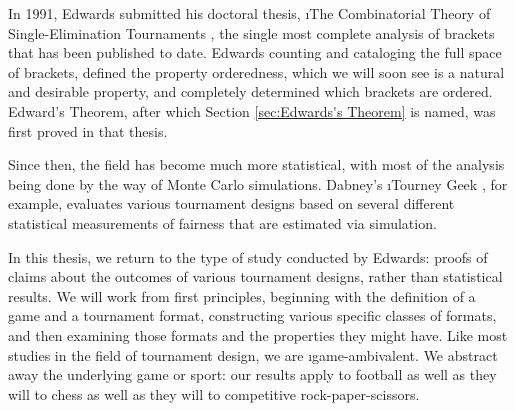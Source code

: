 {       %


    In 1991, Edwards submitted his doctoral thesis, \i{The Combinatorial Theory of Single-Elimination Tournaments} \cite{montana}, the single most complete analysis of brackets that has been published to date. Edwards counting and cataloging the full space of brackets, defined the property orderedness, which we will soon see is a natural and desirable property, and completely determined which brackets are ordered. Edward's Theorem, after which Section \ref{sec:Edwards's Theorem} is named, was first proved in that thesis.

    Since then, the field has become much more statistical, with most of the analysis being done by the way of Monte Carlo simulations. Dabney's \i{Tourney Geek} \cite{geek}, for example, evaluates various tournament designs based on several different statistical measurements of fairness that are estimated via simulation.
    
    In this thesis, we return to the type of study conducted by Edwards: proofs of claims about the outcomes of various tournament designs, rather than statistical results. We will work from first principles, beginning with the definition of a game and a tournament format, constructing various specific classes of formats, and then examining those formats and the properties they might have. Like most studies in the field of tournament design, we are \i{game-ambivalent}. We abstract away the underlying game or sport: our results apply to football as well as they will to chess as well as they will to competitive rock-paper-scissors.
}









